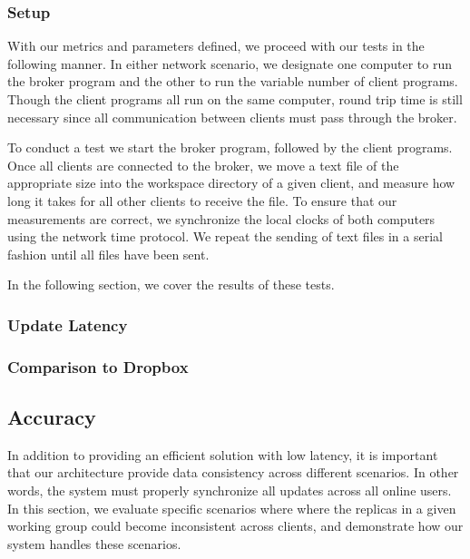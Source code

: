 \subsubsection{Setup}
With our metrics and parameters defined,
we proceed with our tests in the following manner.
In either network scenario,
we designate one computer to run the broker program
and the other to run the variable number of client programs.
Though the client programs all run on the same computer,
round trip time is still necessary since all communication
between clients must pass through the broker.

To conduct a test we start the broker program, followed by the
client programs.
Once all clients are connected to the broker,
we move a text file of the appropriate
size into the workspace directory of a given client,
and measure how long it takes for all other clients
to receive the file.
To ensure that our measurements are correct,
we synchronize the local clocks of both computers
using the network time protocol.
We repeat the sending of text files in a serial fashion
until all files have been sent.

In the following section, we cover the results of these tests.
\subsubsection{Update Latency}

\subsubsection{Comparison to Dropbox}

\subsection{Accuracy}
\label{evaluation.accuracy}
In addition to providing an efficient solution with low latency,
it is important that our architecture provide data consistency across different
scenarios.
In other words, the system must properly synchronize
all updates across all online users.
In this section, we evaluate specific scenarios where
where the replicas in a given working group could become inconsistent across clients,
and demonstrate how our system handles these scenarios.

